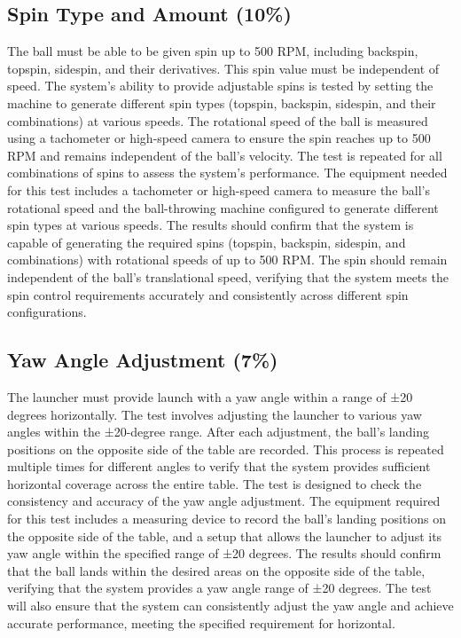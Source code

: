 \documentclass[12pt]{article}
\begin{document}
\subsection{Spin Type and Amount (10\%)}
The ball must be able to be given spin up to 500 RPM, including backspin, topspin, sidespin, and their derivatives. This spin value must be independent of speed. The system’s ability to provide adjustable spins is tested by setting the machine to generate different spin types (topspin, backspin, sidespin, and their combinations) at various speeds. The rotational speed of the ball is measured using a tachometer or high-speed camera to ensure the spin reaches up to 500 RPM and remains independent of the ball’s velocity. The test is repeated for all combinations of spins to assess the system's performance. The equipment needed for this test includes a tachometer or high-speed camera to measure the ball’s rotational speed and the ball-throwing machine configured to generate different spin types at various speeds. The results should confirm that the system is capable of generating the required spins (topspin, backspin, sidespin, and combinations) with rotational speeds of up to 500 RPM. The spin should remain independent of the ball’s translational speed, verifying that the system meets the spin control requirements accurately and consistently across different spin configurations.

\subsection{Yaw Angle Adjustment (7\%)}
The launcher must provide launch with a yaw angle within a range of ±20 degrees horizontally. The test involves adjusting the launcher to various yaw angles within the ±20-degree range. After each adjustment, the ball’s landing positions on the opposite side of the table are recorded. This process is repeated multiple times for different angles to verify that the system provides sufficient horizontal coverage across the entire table. The test is designed to check the consistency and accuracy of the yaw angle adjustment. The equipment required for this test includes a measuring device to record the ball’s landing positions on the opposite side of the table, and a setup that allows the launcher to adjust its yaw angle within the specified range of ±20 degrees. The results should confirm that the ball lands within the desired areas on the opposite side of the table, verifying that the system provides a yaw angle range of ±20 degrees. The test will also ensure that the system can consistently adjust the yaw angle and achieve accurate performance, meeting the specified requirement for horizontal.
\end{document}
